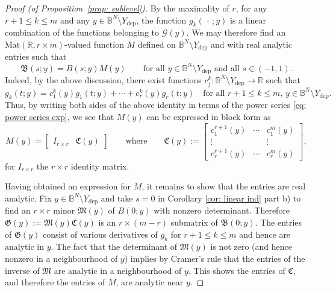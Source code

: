 \documentclass[reqno]{amsart}
\numberwithin{equation}{section}
\newcommand{\B}{\mathbb{B}}
\newcommand{\R}{\mathbb{R}}
\newcommand{\cG}{\mathcal{G}}
\newcommand{\fB}{\mathfrak{B}}
\newcommand{\fC}{\mathfrak{C}}
\newcommand{\fG}{\mathfrak{G}}
\newcommand{\fM}{\mathfrak{M}}
\theoremstyle{plain}
\theoremstyle{definition}
\begin{document}
\begin{proof}[Proof (of Proposition~\ref{prop: sublevel})]
    By the maximality of $r$, for any $r+1 \leq k \leq m$ and any $y \in \B^N\setminus Y_{\mathrm{dep}}$, the function $g_k(\,\cdot\,;y)$ is a linear combination of the functions belonging to $\cG(y)$. We may therefore find an $\mathrm{Mat}(\R, r \times m)$-valued function $M$ defined on $\B^N\setminus Y_{\mathrm{dep}}$ and with real analytic entries such that
    \begin{equation}\label{eq: sublevel 0}
        \fB(s;y) = B(s;y)M(y) \qquad \textrm{for all $y \in \B^N\setminus Y_{\mathrm{dep}}$ and all $s \in (-1,1)$.}
    \end{equation}
  Indeed, by the above discussion, there exist functions $c_j^k \colon \B^N \setminus Y_{\mathrm{dep}} \to \R$ such that
  \begin{equation*}
    g_k(t;y) = c_1^k(y) g_1(t;y) + \cdots + c_r^k(y) g_r(t;y) \quad \textrm{for all $r+1 \le k \le m$, $y \in \B^N \setminus Y_{\mathrm{dep}}$.}  
  \end{equation*}
   Thus, by writing both sides of the above identity in terms of the power series \eqref{eq: power series exp}, we see that $M(y)$ can be expressed in block form as
    \begin{equation*}
    M(y) =
    \begin{bmatrix}
        I_{r\times r} & \fC(y)
    \end{bmatrix}
    \qquad \textrm{where} \qquad
    \fC(y) := \begin{bmatrix}
            c_1^{r+1}(y) & \cdots & c_1^m(y) \\
            \vdots &  & \vdots \\
            c_r^{r+1}(y) & \cdots & c_r^m(y)  
        \end{bmatrix},
    \end{equation*}
    for $I_{r \times r}$ the $r \times r$ identity matrix.
    
    Having obtained an expression for $M$, it remains to show that the  entries are real analytic. Fix $y \in \B^N \setminus Y_{\mathrm{dep}}$ and take $s=0$ in Corollary \ref{cor: linear ind} part b) to find an $r\times r$ minor $\fM(y)$ of $B(0;y)$ with nonzero determinant. Therefore $\fG(y) := \fM(y) \fC(y)$ is an $r \times (m-r)$ submatrix of $\fB(0;y)$. The entries of $\fG(y)$ consist of various derivatives of $g_k$ for $r+1 \leq k \leq m$ and hence are analytic in $y$. The fact that the determinant of $\fM(y)$ is not zero (and hence nonzero in a neighbourhood of $y$) implies by Cramer's rule that the entries of the inverse of $\fM$ are analytic in a neighbourhood of $y$. This shows the entries of $\fC$, and therefore the entries of $M$, are analytic near $y$.
    

\end{proof}
\end{document}
